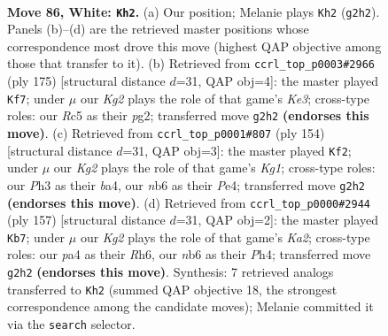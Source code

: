 \documentclass[11pt]{article}
\begin{document}
\clearpage

\begin{figure}[p]\centering
\begin{subfigure}{0.46\textwidth}\centering
\resizebox{\linewidth}{!}{%
\newchessgame
\chessboard[
  setfen={7k/3r4/1n6/2R3B1/p4P2/P6P/6K1/8 w - - 27 86},
  showmover=false,
  pgfstyle=straightmove, color=movearrow, markmove={g2-h2}
]}
\caption{}
\end{subfigure}\hfill
\begin{subfigure}{0.46\textwidth}\centering
\resizebox{\linewidth}{!}{%
\newchessgame
\chessboard[
  setfen={8/8/4kp2/3p3p/4b2P/1R6/5KP1/8 b - - 16 88},
  showmover=false,
  pgfstyle=straightmove, color=movearrow, markmove={e6-f7}
]}
\caption{}
\end{subfigure}
\\[4pt]
\begin{subfigure}{0.46\textwidth}\centering
\resizebox{\linewidth}{!}{%
\newchessgame
\chessboard[
  setfen={5k2/8/6p1/6B1/b3P2P/5P2/8/6K1 w - - 25 78},
  showmover=false,
  pgfstyle=straightmove, color=movearrow, markmove={g1-f2}
]}
\caption{}
\end{subfigure}\hfill
\begin{subfigure}{0.46\textwidth}\centering
\resizebox{\linewidth}{!}{%
\newchessgame
\chessboard[
  setfen={8/k7/7r/2K5/7p/3N1RbP/8/8 b - - 4 79},
  showmover=false,
  pgfstyle=straightmove, color=movearrow, markmove={a7-b7}
]}
\caption{}
\end{subfigure}
\caption{\textbf{Move 86, White: \texttt{Kh2}.} (a) Our position; Melanie plays \texttt{Kh2} (\texttt{g2h2}). Panels (b)--(d) are the retrieved master positions whose correspondence most drove this move (highest QAP objective among those that transfer to it). (b) Retrieved from \texttt{ccrl\_top\_p0003\#2966} (ply 175) [structural distance $d$=31, QAP obj=4]: the master played \texttt{Kf7}; under $\mu$ our \emph{Kg2} plays the role of that game's \emph{Ke3}; cross-type roles: our \emph{R}c5 as their \emph{p}g2; transferred move \texttt{g2h2} \textbf{(endorses this move)}. (c) Retrieved from \texttt{ccrl\_top\_p0001\#807} (ply 154) [structural distance $d$=31, QAP obj=3]: the master played \texttt{Kf2}; under $\mu$ our \emph{Kg2} plays the role of that game's \emph{Kg1}; cross-type roles: our \emph{P}h3 as their \emph{b}a4, our \emph{n}b6 as their \emph{P}e4; transferred move \texttt{g2h2} \textbf{(endorses this move)}. (d) Retrieved from \texttt{ccrl\_top\_p0000\#2944} (ply 157) [structural distance $d$=31, QAP obj=2]: the master played \texttt{Kb7}; under $\mu$ our \emph{Kg2} plays the role of that game's \emph{Ka2}; cross-type roles: our \emph{p}a4 as their \emph{R}h6, our \emph{n}b6 as their \emph{P}h4; transferred move \texttt{g2h2} \textbf{(endorses this move)}. Synthesis: 7 retrieved analogs transferred to \texttt{Kh2} (summed QAP objective 18, the strongest correspondence among the candidate moves); Melanie committed it via the \texttt{search} selector.}
\label{fig:thought-m170}
\end{figure}
\end{document}
